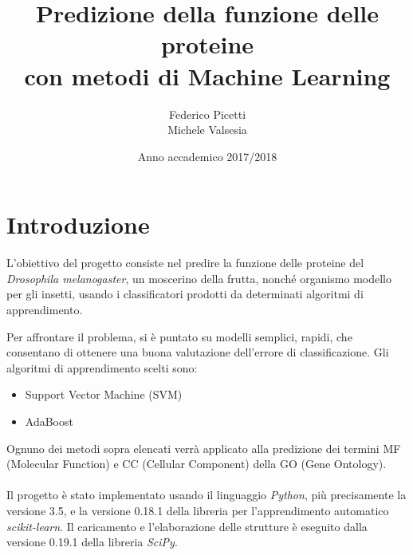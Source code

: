 \documentclass[12pt,a4paper,oneside,hidelinks]{report}
\begin{document}

\title{%
        Predizione della funzione delle proteine \\
        con metodi di Machine Learning}
  
\author{Federico Picetti \\
        Michele Valsesia}

\date{Anno accademico 2017/2018} 

\maketitle

\tableofcontents


\newpage

\section*{Introduzione}
L'obiettivo del progetto consiste nel predire la funzione delle proteine del \textit{Drosophila melanogaster}, un moscerino della frutta, nonché organismo modello per gli insetti, usando i classificatori prodotti da determinati algoritmi di apprendimento. 

Per affrontare il problema, si è puntato su modelli semplici, rapidi, che consentano di ottenere una buona valutazione dell'errore di classificazione. Gli algoritmi di apprendimento scelti sono: 

\begin{itemize}
    \item Support Vector Machine (SVM)
    \item AdaBoost
\end{itemize}

Ognuno dei metodi sopra elencati verrà applicato alla predizione dei termini MF (Molecular Function) e CC (Cellular Component) della GO (Gene Ontology).

\paragraph*{}
Il progetto è stato implementato usando il linguaggio \textit{Python}, più precisamente la versione 3.5, e la versione 0.18.1 della libreria per l'apprendimento automatico \textit{scikit-learn}. Il caricamento e l'elaborazione delle strutture è eseguito dalla versione 0.19.1 della libreria \textit{SciPy}.
\end{document}
